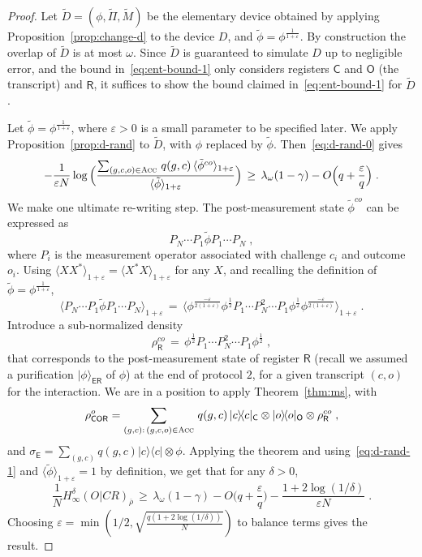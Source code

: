 \documentclass[11pt]{article}
\theoremstyle{remark}
\theoremstyle{definition}
\newcommand{\ket}[1]{|#1\rangle}
\newcommand{\bra}[1]{\langle#1|}
\newcommand{\proj}[1]{\ket{#1}\!\bra{#1}}
\newcommand{\reg}[1]{{\textsf{#1}}}
\newcommand{\ol}[1]{\overline{#1}}
\newcommand{\eps}{\varepsilon}
\newcommand{\Acc}{\textsc{Acc}}
\newcommand{\Hmin}{H_\infty}
\begin{document}
\begin{proof}
Let $\tilde{D} = (\phi,\tilde{\Pi},\tilde{M})$ be the elementary device obtained by applying Proposition~\ref{prop:change-d} to the device $D$, and $\tilde{\phi}= \phi^{\frac{1}{1+\eps}}$. By construction the overlap of $\tilde{D}$ is at most $\omega$. Since $\tilde{D}$ is guaranteed to simulate $D$ up to negligible error, and the bound in~\eqref{eq:ent-bound-1} only considers registers $\reg{C}$ and $\reg{O}$ (the transcript) and $\reg{R}$, it suffices to show the bound claimed in~\eqref{eq:ent-bound-1} for $\tilde{D}$. 

Let $\tilde{\phi}= \phi^{\frac{1}{1+\eps}}$, where $\eps>0$ is a small parameter to be specified later. We apply Proposition~\ref{prop:d-rand} to $\tilde{D}$, with $\phi$ replaced by $\tilde{\phi}$. Then~\eqref{eq:d-rand-0} gives
\begin{equation}\label{eq:d-rand-1}
- \frac{1}{\eps N} \log \Big( \frac{ \sum_{(g,c,o) \in \Acc} \,q(g,c)\, \langle \tilde{\phi}^{co} \rangle_{1+\eps}}{\langle \tilde{\phi} \rangle_{1+\eps} }\Big) \,\geq\,  \lambda_\omega(1-\gamma) - O\Big(q+\frac{\eps}{q}\Big)\;.
\end{equation}
We make one ultimate re-writing step. The post-measurement state $\tilde{\phi}^{co}$ can be expressed as 
$$P_N\cdots P_1\tilde{\phi} P_1 \cdots P_N\;,$$
 where $P_i$ is the measurement operator associated with challenge $c_i$ and outcome $o_i$. Using $\langle XX^*\rangle_{1+\eps} = \langle X^* X \rangle_{1+\eps}$ for any $X$, and recalling the definition of $\tilde{\phi} = \phi^{\frac{1}{1+\eps}}$, 
$$\langle P_N\cdots P_1\tilde{\phi} P_1 \cdots P_N \rangle_{1+\eps} \,=\, \langle \phi^{\frac{-\eps}{2(1+\eps)}} \phi^{\frac{1}{2}}P_1\cdots P_N^2 \cdots P_1\phi^{\frac{1}{2}}\phi^{\frac{-\eps}{2(1+\eps)}} \rangle_{1+\eps}\;.$$
Introduce a sub-normalized density 
$$\rho_\reg{R}^{co}\,=\, \phi^{\frac{1}{2}}P_1\cdots P_N^2 \cdots P_1\phi^{\frac{1}{2}}\;,$$
that corresponds to the post-measurement state of register $\reg{R}$ (recall we assumed a purification $\ket{\phi}_{\reg{ER}}$ of $\phi$) at the end of protocol $2$, for a given transcript $(c,o)$ for the interaction. We are in a position to apply Theorem~\ref{thm:ms}, with 
$$\rho_{\reg{COR}}^o = \sum_{(g,c):\,(g,c,o)\in \Acc} \,q(g,c)\, \proj{c}_\reg{C} \otimes \proj{o}_\reg{O}\otimes \rho_\reg{R}^{co}\;,$$
and $\sigma_\reg{E} = \sum_{(g,c)} q(g,c)\proj{c} \otimes \phi$. Applying the theorem and using~\eqref{eq:d-rand-1} and $\langle\tilde{\phi}\rangle_{1+\eps} = 1$ by definition, we get that for any $\delta >0$,
$$\frac{1}{N} \Hmin^\delta(O|CR)_{\ol{\rho}} \,\geq \,  \lambda_\omega(1-\gamma) - O\Big(q+\frac{\eps}{q}\Big) - \frac{1+2\log(1/\delta)}{\eps N}\;.$$
Choosing $\eps = \min(1/2,\sqrt{\frac{q(1+2\log(1/\delta))}{N}})$ to balance terms gives the result. 
\end{proof}
\end{document}
